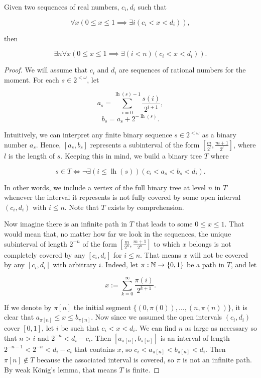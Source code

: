 \documentclass[../main.tex]{memoir}
\begin{document}
\begin{theorem}
  Given two sequences of real numbers, $c_i, d_i$ such that

  \[ \forall x (0 \le x \le 1 \implies \exists i (c_i < x < d_i)), \]

  then

  \[ \exists n \forall x (0 \le x \le 1 \implies \exists (i < n) (c_i < x < d_i)). \]
\end{theorem}
\begin{proof}
  We will assume that $c_i$ and $d_i$ are sequences of rational numbers for the moment. For each $s \in 2^{<\omega}$, let

  \[ a_s = \sum_{i = 0}^{\operatorname{lh}(s) - 1} \frac{s(i)}{2^{i + 1}}, \]
  \[ b_s = a_s + 2^{-\operatorname{lh}(s)}. \]

  Intuitively, we can interpret any finite binary sequence $s \in 2^{<\omega}$ as a binary number $a_s$. Hence, $[a_s, b_s]$ represents a subinterval of the form $[\frac{m}{2^l}, \frac{m + 1}{2^l}]$, where $l$ is the length of $s$. Keeping this in mind, we build a binary tree $T$ where

  \[ s \in T \iff \neg \exists (i \le \operatorname{lh}(s)) (c_i < a_s < b_s < d_i). \]

  In other words, we include a vertex of the full binary tree at level $n$ in $T$ whenever the interval it represents is not fully covered by some open interval $(c_i, d_i)$ with $i \le n$. Note that $T$ exists by  comprehension.

  Now imagine there is an infinite path in $T$ that leads to some $0 \le x \le 1$. That would mean that, no matter how far we look in the sequences, the unique subinterval of length $2^{-n}$ of the form $[\frac{m}{2^n}, \frac{m + 1}{2^n}]$ to which $x$ belongs is not completely covered by any $[c_i, d_i]$ for $i \le n$. That means $x$ will not be covered by any $[c_i, d_i]$ with arbitrary $i$. Indeed, let $\pi: \mathbb{N} \to \{0, 1\}$ be a path in $T$, and let

  \[ x := \sum_{k = 0}^{\infty} \frac{\pi(i)}{2^{k + 1}}. \]

  If we denote by $\pi[n]$ the initial segment $\{(0, \pi(0)), \ldots, (n, \pi(n))\}$, it is clear that $a_{\pi[n]} \le x \le b_{\pi[n]}$. Now since we assumed the open intervals $(c_i, d_i)$ cover $[0, 1]$, let $i$ be such that $c_i < x < d_i$. We can find $n$ as large as necessary so that $n > i$ and $2^{-n} < d_i - c_i$. Then $[a_{\pi[n]}, b_{\pi[n]}]$ is an interval of length $2^{-n - 1} < 2^{-n} < d_i - c_i$ that contains $x$, so $c_i < a_{\pi[n]} < b_{\pi[n]} < d_i$. Then $\pi[n] \not\in T$ because the associated interval is covered, so $\pi$ is not an infinite path. By weak König's lemma, that means $T$ is finite.


\end{proof}
\end{document}
